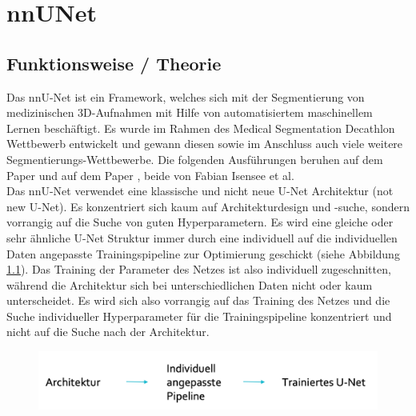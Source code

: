 \chapter{nnUNet}
\label{ch:nnunet}


\section{Funktionsweise / Theorie}



Das nnU-Net ist ein Framework, welches sich mit der Segmentierung von medizinischen 3D-Aufnahmen mit Hilfe von automatisiertem maschinellem Lernen beschäftigt. Es wurde im Rahmen des Medical Segmentation Decathlon Wettbewerb entwickelt und gewann diesen sowie im Anschluss auch viele weitere Segmentierungs-Wettbewerbe. Die folgenden Ausführungen beruhen auf dem Paper \cite{nnunetPaper} und auf dem Paper \cite{nnunetPaperB} , beide von Fabian Isensee et al. \\
Das nnU-Net verwendet eine klassische und nicht neue U-Net Architektur (not new U-Net). Es konzentriert sich kaum auf  Architekturdesign und -suche, sondern vorrangig auf die Suche von guten Hyperparametern. Es wird eine gleiche oder sehr ähnliche U-Net Struktur immer durch eine individuell auf die individuellen Daten angepasste Trainingspipeline zur Optimierung geschickt (siehe Abbildung \ref{pic:nnUnet_Basisschema}). Das Training der Parameter des Netzes ist also individuell zugeschnitten, während die Architektur sich bei unterschiedlichen Daten nicht oder kaum unterscheidet. Es wird sich also vorrangig auf das Training des Netzes und die Suche individueller Hyperparameter für die Trainingspipeline konzentriert und nicht auf die Suche nach der Architektur. 

\begin{figure}[H]
	
	\centering
	\includegraphics[scale=0.3]{Pictures/nnUnet/Bild01.png}
	\caption{}
	\label{pic:nnUnet_Basisschema}
\end{figure}



